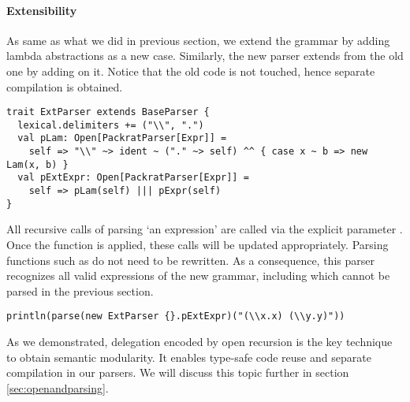 


\paragraph{Extensibility} As same as what we did in previous section, we extend the grammar by adding lambda abstractions as a new case. Similarly, the new parser extends from the old one by adding  on it. Notice that the old code is not touched, hence separate compilation is obtained.

\begin{lstlisting}
trait ExtParser extends BaseParser {
  lexical.delimiters += ("\\", ".")
  val pLam: Open[PackratParser[Expr]] =
    self => "\\" ~> ident ~ ("." ~> self) ^^ { case x ~ b => new Lam(x, b) }
  val pExtExpr: Open[PackratParser[Expr]] =
    self => pLam(self) ||| pExpr(self)
}
\end{lstlisting}

All recursive calls of parsing `an expression' are called via the explicit parameter . Once the  function is applied, these calls will be updated appropriately. Parsing functions such as  do not need to be rewritten. As a consequence, this parser recognizes all valid expressions of the new grammar, including   which cannot be parsed in the previous section.

\begin{lstlisting}
println(parse(new ExtParser {}.pExtExpr)("(\\x.x) (\\y.y)"))
\end{lstlisting}

As we demonstrated, delegation encoded by open recursion is the key technique to obtain semantic modularity. It enables type-safe code reuse and separate compilation in our parsers. We will discuss this topic further in section \ref{sec:openandparsing}.

